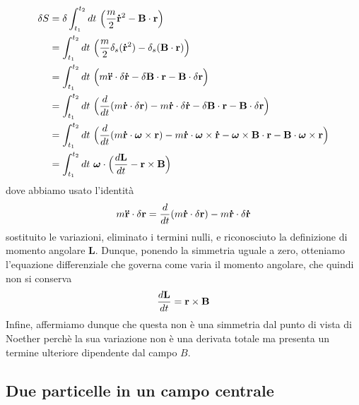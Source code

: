 \begin{example}
\begin{equation*}
\begin{aligned}
        \delta S & = \delta \int_{t_1}^{t_2}dt~ \Big( \frac{m}{2} \mathbf{\dot r}^2 - \mathbf B \cdot \mathbf r \Big) \\ & = \int_{t_1}^{t_2}dt~ \Big( \frac{m}{2} \delta_s (\mathbf{\dot r}^2) - \delta_s (\mathbf B \cdot \mathbf r ) \Big ) \\ & = \int_{t_1}^{t_2}dt~ \Big( m \mathbf{\ddot r } \cdot \delta \mathbf{\dot r} - \delta \mathbf B \cdot \mathbf r - \mathbf B \cdot \delta \mathbf r \Big )  \\ & = \int_{t_1}^{t_2}dt~ \Big( \frac{d}{dt} (m \mathbf{\dot r} \cdot \delta \mathbf r) - m \mathbf{\dot r} \cdot \delta \mathbf{\dot r} - \delta \mathbf B \cdot \mathbf r - \mathbf B \cdot \delta \mathbf r \Big )  \\ & = \int_{t_1}^{t_2}dt~ \Big( \frac{d}{dt} (m \mathbf{\dot r} \cdot \boldsymbol \omega \times \mathbf r) - m \mathbf{\dot r} \cdot \boldsymbol \omega \times \mathbf{\dot r} - \boldsymbol \omega \times \mathbf B \cdot \mathbf r - \mathbf B \cdot \boldsymbol \omega \times \mathbf r \Big ) \\ & = \int_{t_1}^{t_2}dt~ \boldsymbol \omega \cdot \Big( \frac{d\mathbf L}{dt} - \mathbf r \times \mathbf B \Big)
    \end{aligned}
    \end{equation*} 
        dove abbiamo usato l'identità
    \begin{equation*}
        m \mathbf{\ddot r} \cdot \delta \mathbf r = \frac{d}{dt} (m \mathbf{\dot r} \cdot \delta \mathbf r) - m \mathbf{\dot r} \cdot \delta \mathbf{\dot r} 
    \end{equation*} 
        sostituito le variazioni, eliminato i termini nulli, e riconosciuto la definizione di momento angolare $\mathbf L$. Dunque, ponendo la simmetria uguale a zero, otteniamo l'equazione differenziale che governa come varia il momento angolare, che quindi non si conserva 
    \begin{equation*}
        \frac{d\mathbf L}{dt} = \mathbf r \times \mathbf B 
    \end{equation*}
        Infine, affermiamo dunque che questa non è una simmetria dal punto di vista di Noether perchè la sua variazione non è una derivata totale ma presenta un termine ulteriore dipendente dal campo $B$.
    \end{example}

\subsection{Due particelle in un campo centrale}

